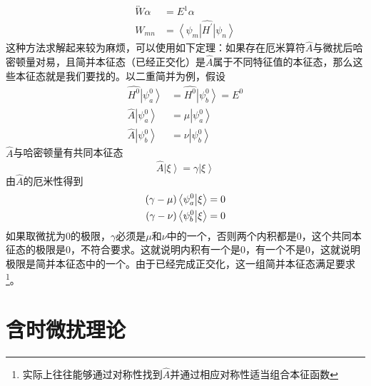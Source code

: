 \documentclass[12pt, a4paper, oneside]{ctexart}
\begin{document}
	\begin{align}
		\overleftrightarrow{W}\alpha&=E^{1}\alpha\\
		W_{mn}&=\left<\psi_{m}\right|\hat{H^{\prime}}\left|\psi_{n}\right>
	\end{align}
	\quad\quad 这种方法求解起来较为麻烦，可以使用如下定理：如果存在厄米算符$\hat{A}$与微扰后哈密顿量对易，且简并本征态（已经正交化）是$\hat{A}$属于不同特征值的本征态，那么这些本征态就是我们要找的。以二重简并为例，假设
	\begin{align}
		\hat{H^{0}}\left|\psi_{a}^{0}\right>&=\hat{H^{0}}\left|\psi_{b}^{0}\right>=E^{0}\\
		\hat{A}\left|\psi_{a}^{0}\right>&=\mu\left|\psi_{a}^{0}\right>\\
		\hat{A}\left|\psi_{b}^{0}\right>&=\nu\left|\psi_{b}^{0}\right>
	\end{align}
	\quad\quad $\hat{A}$与哈密顿量有共同本征态
	\begin{equation}
		\hat{A}\left|\xi\right>=\gamma\left|\xi\right>
	\end{equation}
	\quad\quad 由$\hat{A}$的厄米性得到
	\begin{align}
		(\gamma-\mu)\left<\psi_{a}^{0}\big{|}\xi\right>&=0\\
		(\gamma-\nu)\left<\psi_{b}^{0}\big{|}\xi\right>&=0
	\end{align}
	\quad\quad 如果取微扰为$0$的极限，$\gamma$必须是$\mu$和$\nu$中的一个，否则两个内积都是$0$，这个共同本征态的极限是$0$，不符合要求。这就说明内积有一个是$0$，有一个不是$0$，这就说明极限是简并本征态中的一个。由于已经完成正交化，这一组简并本征态满足要求\footnote{实际上往往能够通过对称性找到$\hat{A}$并通过相应对称性适当组合本征函数}。
	\section{含时微扰理论}
	
\end{document}
